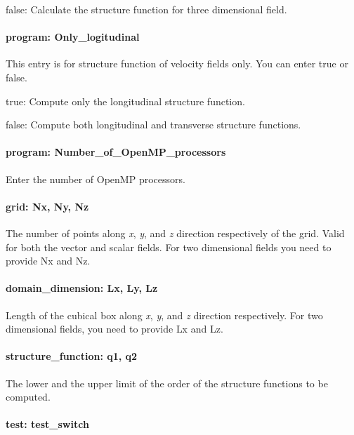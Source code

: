 {\ttfamily false}\-: Calculate the structure function for three dimensional field.

\paragraph*{{\ttfamily program\-: Only\-\_\-logitudinal}}

This entry is for structure function of velocity fields only. You can enter {\ttfamily true} or {\ttfamily false}.

{\ttfamily true}\-: Compute only the longitudinal structure function.

{\ttfamily false}\-: Compute both longitudinal and transverse structure functions.

\paragraph*{{\ttfamily program\-: Number\-\_\-of\-\_\-\-Open\-M\-P\-\_\-processors}}

Enter the number of Open\-M\-P processors.

\paragraph*{{\ttfamily grid\-: Nx, Ny, Nz}}

The number of points along {\itshape x}, {\itshape y}, and {\itshape z} direction respectively of the grid. Valid for both the vector and scalar fields. For two dimensional fields you need to provide {\ttfamily Nx} and {\ttfamily Nz}.

\paragraph*{{\ttfamily domain\-\_\-dimension\-: Lx, Ly, Lz}}

Length of the cubical box along {\itshape x}, {\itshape y}, and {\itshape z} direction respectively. For two dimensional fields, you need to provide {\ttfamily Lx} and {\ttfamily Lz}.

\paragraph*{{\ttfamily structure\-\_\-function\-: q1, q2}}

The lower and the upper limit of the order of the structure functions to be computed.

\paragraph*{{\ttfamily test\-: test\-\_\-switch}}

